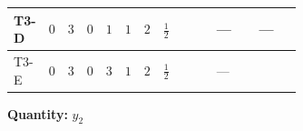 \documentclass[8pt]{article}
\begin{document}
\begin{landscape}
\begin{longtable}{@{}llcccccc >{\raggedright\arraybackslash}p{0.21\linewidth} >{\raggedright\arraybackslash}p{0.21\linewidth} >{\raggedright\arraybackslash}p{0.21\linewidth}@{}}
\midrule
T3-D & $0$ & $3$ & $0$ & $1$ & $1$ & $2$ & $\frac{1}{2}$ & \scriptsize\adjustbox{max width=\linewidth}{$\begin{gathered} -\frac{3}{2} {g_1}^2 \left({y_2}\right)_{ij}\end{gathered}$} & --- & --- \\
\midrule
T3-E & $0$ & $3$ & $0$ & $3$ & $1$ & $2$ & $\frac{1}{2}$ & \scriptsize\adjustbox{max width=\linewidth}{$\begin{gathered} -\frac{3}{2} {g_1}^2 \left({y_2}\right)_{ij}\end{gathered}$} & --- & \scriptsize\adjustbox{max width=\linewidth}{$\begin{gathered} +\frac{1}{4} (3 \left({y_1}\,\left({y_1}\right)^{\dagger}\,{y_2}\right)_{ij}+2 \left({Y_e}\,\left({Y_e}\right)^{\dagger}\,{y_2}\right)_{ij}+6 \left({y_2}\,\left({y_2}\right)^{\dagger}\,{y_2}\right)_{ij})\end{gathered}$} \\
\midrule
\bottomrule
\end{longtable}
\clearpage
\noindent\textbf{Quantity: }$y_2$\par\smallskip

\end{landscape}
\end{document}
